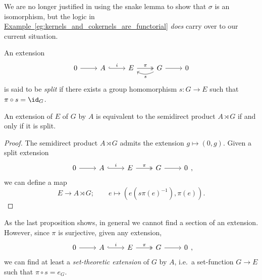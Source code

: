 \documentclass[main.tex]{subfiles}
\begin{document}
We are no longer justified in using the snake lemma to show that $\sigma$ is an isomorphism, but the logic in \hyperref[eg:kernels_and_cokernels_are_functorial]{Example~\ref*{eg:kernels_and_cokernels_are_functorial}} \emph{does} carry over to our current situation.

\begin{definition}
  \label{def:split_extension}
  An extension
  \begin{equation*}
    \begin{tikzcd}
      0
      \arrow[r]
      & A
      \arrow[r, hook, "i"]
      & E
      \arrow[r, two heads, "\pi"]
      & G
      \arrow[r]
      \arrow[l, bend left, "s"]
      & 0
    \end{tikzcd}
  \end{equation*}
  is said to be \emph{split} if there exists a group homomorphism $s\colon G \to E$ such that $\pi \circ s = \id_{G}$.
\end{definition}

\begin{proposition}
  An extension of $E$ of $G$ by $A$ is equivalent to the semidirect product $A \rtimes G$ if and only if it is split.
\end{proposition}
\begin{proof}
  The semidirect product $A \rtimes G$ admits the extension $g \mapsto (0, g)$. Given a split extension
  \begin{equation*}
    \begin{tikzcd}
      0
      \arrow[r]
      & A
      \arrow[r, hook, "i"]
      & E
      \arrow[r, two heads, "\pi"]
      & G
      \arrow[r]
      & 0
    \end{tikzcd},
  \end{equation*}
  we can define a map
  \begin{equation*}
    E \to A \rtimes G;\qquad e \mapsto (e(s\pi(e)^{-1}), \pi(e)).
  \end{equation*}
\end{proof}

As the last proposition shows, in general we cannot find a section of an extension. However, since $\pi$ is surjective, given any extension,
\begin{equation*}
  \begin{tikzcd}
    0
    \arrow[r]
    & A
    \arrow[r, hook, "i"]
    & E
    \arrow[r, two heads, "\pi"]
    & G
    \arrow[r]
    & 0
  \end{tikzcd},
\end{equation*}
we can find at least a \emph{set-theoretic extension} of $G$ by $A$, i.e.\ a set-function $G \to E$ such that $\pi \circ s = e_{G}$.
\end{document}
